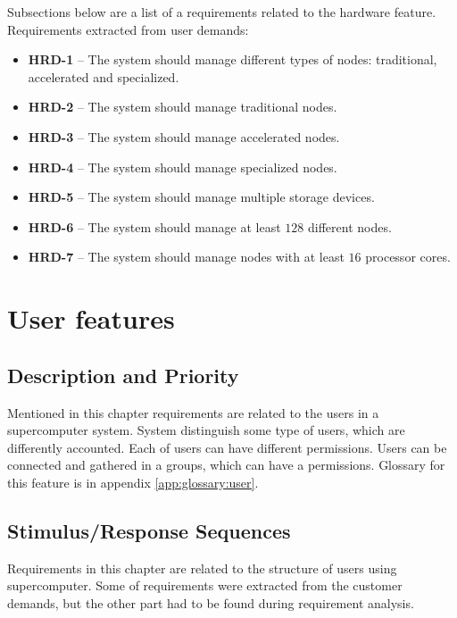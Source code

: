 \documentclass{report}
\begin{document}
Subsections below are a list of a requirements related to the hardware feature.
Requirements extracted from user demands:
\begin{itemize}
	\item
	{
		\textbf{HRD-1} -- The system should manage different types of nodes: traditional, accelerated and specialized.	
	}
	\item
	{
		\textbf{HRD-2} -- The system should manage traditional nodes.
	}
	\item
	{
		\textbf{HRD-3} -- The system should manage accelerated nodes.
	}
	\item
	{
		\textbf{HRD-4} -- The system should manage specialized nodes.
	}
	\item
	{
		\textbf{HRD-5} -- The system should manage multiple storage devices.
	}
	\item
	{
		\textbf{HRD-6} -- The system should manage at least $128$ different nodes.
	}
	\item
	{
		\textbf{HRD-7} -- The system should manage nodes with at least $16$ processor cores.
	}
\end{itemize}


\section{User features} \label{sec:uf}

\subsection{Description and Priority}
Mentioned in this chapter requirements are related to the users in a supercomputer system. System distinguish some type of users, which are differently accounted. Each of users can have different permissions. Users can be connected and gathered in a groups, which can have a permissions. 
Glossary for this feature is in appendix \ref{app:glossary:user}.

\subsection{Stimulus/Response Sequences}
Requirements in this chapter are related to the structure of users using supercomputer. Some of requirements were extracted from the customer demands, but the other part had to be found during requirement analysis.
\end{document}
